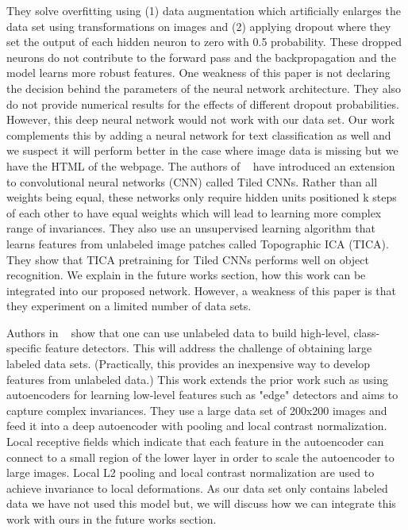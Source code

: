 \documentclass{article} %
\begin{document}
They solve overfitting using (1) data augmentation which artificially enlarges the data set using transformations on images and (2) applying dropout where they set the output of each hidden neuron to zero with 0.5 probability. These dropped neurons do not contribute to the forward pass and the backpropagation and the model learns more robust features.
One weakness of this paper is not declaring the decision behind the parameters of the neural network architecture. They also do not provide numerical results for the effects of different dropout probabilities. However, this deep neural network would not work with our data set. Our work complements this by adding a neural network for text classification as well and we suspect it will perform better in the case where image data is missing but we have the HTML of the webpage.
The authors of ~\cite{nipsandrewng} have introduced an extension to convolutional neural networks (CNN) called Tiled CNNs. Rather than all weights being equal, these networks only require hidden units positioned k steps of each other to have equal weights which will lead to learning more complex range of invariances. 
They also use an unsupervised learning algorithm that learns features from unlabeled image patches called Topographic ICA (TICA). They show that TICA pretraining for Tiled CNNs performs well on object recognition. We explain in the future works section, how this work can be integrated into our proposed network. However, a weakness of this paper is that they experiment on a limited number of data sets.

Authors in ~\cite{icml_unsupervised} show that one can use unlabeled data to build high-level, class-specific feature detectors. This will address the challenge of obtaining large labeled data sets. (Practically, this provides an inexpensive way to develop features from unlabeled data.) This work extends the prior work such as using autoencoders for learning low-level features such as "edge" detectors and aims to capture complex invariances. They use a large data set of 200x200 images and feed it into a deep autoencoder with pooling and local contrast normalization. Local receptive fields which indicate that each feature in the autoencoder can connect to a small region of the lower layer in order to scale the autoencoder to large images. Local L2 pooling and local contrast normalization are used to achieve invariance to local deformations. As our data set only contains labeled data we have not used this model but, we will discuss how we can integrate this work with ours in the future works section.
\end{document}
